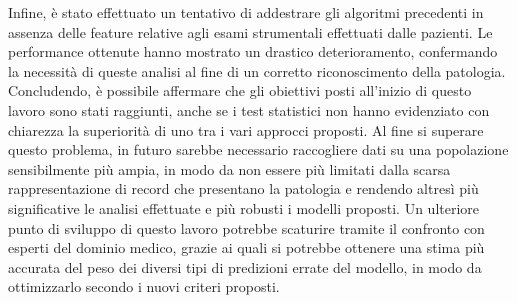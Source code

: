 Infine, è stato effettuato un tentativo di addestrare gli algoritmi precedenti in assenza delle feature relative agli esami strumentali effettuati dalle pazienti. Le performance ottenute hanno mostrato un drastico deterioramento, confermando la necessità di queste analisi al fine di un corretto riconoscimento della patologia.
Concludendo, è possibile affermare che gli obiettivi posti all'inizio di questo lavoro sono stati raggiunti, anche se i test statistici non hanno evidenziato con chiarezza la superiorità di uno tra i vari approcci proposti. Al fine si superare questo problema, in futuro sarebbe necessario raccogliere dati su una popolazione sensibilmente più ampia, in modo da non essere più limitati dalla scarsa rappresentazione di record che presentano la patologia e rendendo altresì più significative le analisi effettuate e più robusti i modelli proposti.
Un ulteriore punto di sviluppo di questo lavoro potrebbe scaturire tramite il confronto con esperti del dominio medico, grazie ai quali si potrebbe ottenere una stima più accurata del peso dei diversi tipi di predizioni errate del modello, in modo da ottimizzarlo secondo i nuovi criteri proposti.